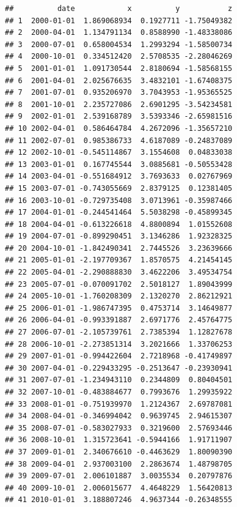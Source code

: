 \documentclass[
]{article}
\newenvironment{Shaded}{\begin{snugshade}}{\end{snugshade}}
\newcommand{\NormalTok}[1]{#1}
\newcommand{\SpecialCharTok}[1]{\textcolor[rgb]{0.00,0.00,0.00}{#1}}
\begin{document}
\begin{Shaded}
\end{Shaded}

\begin{verbatim}
##          date            x          y           z
## 1  2000-01-01  1.869068934  0.1927711 -1.75049382
## 2  2000-04-01  1.134791134  0.8588990 -1.48338086
## 3  2000-07-01  0.658004534  1.2993294 -1.58500734
## 4  2000-10-01  0.334512420  2.5708535 -2.28046269
## 5  2001-01-01  1.091730544  2.8180694 -1.58568155
## 6  2001-04-01  2.025676635  3.4832101 -1.67408375
## 7  2001-07-01  0.935206970  3.7043953 -1.95365525
## 8  2001-10-01  2.235727086  2.6901295 -3.54234581
## 9  2002-01-01  2.539168789  3.5393346 -2.65981516
## 10 2002-04-01  0.586464784  4.2672096 -1.35657210
## 11 2002-07-01  0.985386733  4.6187089 -0.24837089
## 12 2002-10-01 -0.545114867  3.1554608  0.04833038
## 13 2003-01-01  0.167745544  3.0885681 -0.50553428
## 14 2003-04-01 -0.551684912  3.7693633  0.02767969
## 15 2003-07-01 -0.743055669  2.8379125  0.12381405
## 16 2003-10-01 -0.729735408  3.0713961 -0.35987466
## 17 2004-01-01 -0.244541464  5.5038298 -0.45899345
## 18 2004-04-01 -0.613226618  4.8800894  1.01552608
## 19 2004-07-01 -0.899290451  3.1346286  1.92328325
## 20 2004-10-01 -1.842490341  2.7445526  3.23639666
## 21 2005-01-01 -2.197709367  1.8570575  4.21454145
## 22 2005-04-01 -2.290888830  3.4622206  3.49534754
## 23 2005-07-01 -0.070091702  2.5018127  1.89043999
## 24 2005-10-01 -1.760208309  2.1320270  2.86212921
## 25 2006-01-01 -1.986747395  0.4753714  3.14649877
## 26 2006-04-01 -0.993391887  2.6971776  2.45764775
## 27 2006-07-01 -2.105739761  2.7385394  1.12827678
## 28 2006-10-01 -2.273851314  3.2021666  1.33706253
## 29 2007-01-01 -0.994422604  2.7218968 -0.41749897
## 30 2007-04-01 -0.229433295 -0.2513647 -0.23930941
## 31 2007-07-01 -1.234943110  0.2344809  0.80404501
## 32 2007-10-01 -0.483884677  0.7993676  1.29935922
## 33 2008-01-01 -0.751939970  1.2124367  2.69787081
## 34 2008-04-01 -0.346994042  0.9639745  2.94615307
## 35 2008-07-01 -0.583027933  0.3219600  2.57693446
## 36 2008-10-01  1.315723641 -0.5944166  1.91711907
## 37 2009-01-01  2.340676610 -0.4463629  1.80090390
## 38 2009-04-01  2.937003100  2.2863674  1.48798705
## 39 2009-07-01  2.006101887  3.0035534  0.20797876
## 40 2009-10-01  2.006015677  4.4648229  1.56420813
## 41 2010-01-01  3.188807246  4.9637344 -0.26348555

\end{verbatim}
\end{document}
